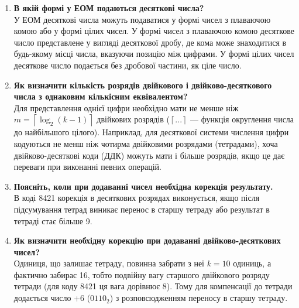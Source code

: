 \documentclass[12pt,a4paper]{article}
\begin{document}
    \begin{enumerate}
    \item \textbf{В якій формі  у ЕОМ подаються десяткові числа?} \\
    У ЕОМ десяткові числа можуть подаватися у формі чисел з плаваючою комою або у формі цілих чисел. У формі чисел з плаваючою комою десяткове число представлене у вигляді десяткової дробу, де кома може знаходитися в будь-якому місці числа, вказуючи позицію між цифрами. У формі цілих чисел десяткове число подається без дробової частини, як ціле число.

    \vspace{1em}

    \item \textbf{Як визначити кількість розрядів двійкового і двійково-десяткового числа з однаковим кількісним еквівалентом?} \\
    Для представлення однієї цифри необхідно мати не менше ніж $m = \left\lceil \log_2(k - 1) \right\rceil$
    двійкових розрядів ($\left\lceil ... \right\rceil$ --- функція округлення числа до найбільшого цілого).
    Наприклад, для десяткової системи числення цифри кодуються не менш ніж чотирма двійковими розрядами (тетрадами), хоча двійково-десяткові коди (ДДК) можуть мати і більше розрядів, якщо це дає переваги при виконанні певних операцій.

    \vspace{1em}

    \item \textbf{Поясніть, коли при додаванні чисел необхідна корекція результату.} \\
    В коді 8421 корекція в десяткових розрядах виконується, якщо після підсумування тетрад виникає перенос в старшу тетраду або результат в тетраді стає більше 9.

    \vspace{1em}

    \item \textbf{Як визначити необхідну корекцію при додаванні двійково-десяткових чисел?} \\
    Одиниця, що залишає тетраду, повинна забрати з неї $k=10$ одиниць, а фактично забирає 16, тобто подвійну вагу старшого двійкового розряду тетради
    (для коду 8421 ця вага дорівнює 8). Тому для компенсації до тетради додається число +6 ($0110_2$) з розповсюдженням переносу в старшу тетраду.

    \vspace{1em}


\end{enumerate}
\end{document}
